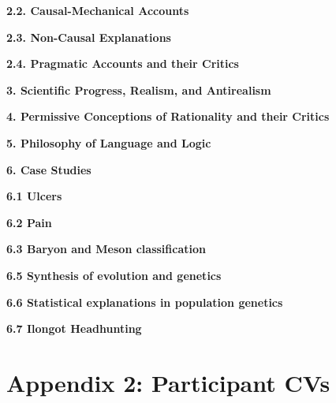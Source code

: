 \documentclass{article}[11pt]
\begin{document}
\textbf{2.2. Causal-Mechanical Accounts}

\printbibliography[keyword=Causal-Mechanical]

\textbf{2.3. Non-Causal Explanations}

\printbibliography[keyword=Non-Causal]

\textbf{2.4. Pragmatic Accounts and their Critics}

\printbibliography[keyword=Pragmatic]

\textbf{{\large 3. Scientific Progress, Realism, and Antirealism}}

\printbibliography[keyword=Realism]

\textbf{{\large 4. Permissive Conceptions of Rationality and their Critics}}

\printbibliography[keyword=permissivism]

\textbf{{\large 5. Philosophy of Language and Logic}}

\printbibliography[keyword=Language_and_Logic]

\textbf{{\large 6. Case Studies}}\vspace{3mm}

\textbf{{6.1 Ulcers}}

\printbibliography[keyword=Ulcers]

\textbf{{6.2 Pain}}

\printbibliography[keyword=Pain]

\textbf{{6.3 Baryon and Meson classification}}

\printbibliography[keyword=Baryon_Meson]

\textbf{{6.5 Synthesis of evolution and genetics}}

\printbibliography[keyword=Gen_Syn]

\textbf{{6.6 Statistical explanations in population genetics}}

\printbibliography[keyword=Pop_genetics]

\textbf{{6.7 Ilongot Headhunting }}

\printbibliography[keyword=Headhunting]

\clearpage

\section{Appendix 2: Participant CVs}
\end{document}
